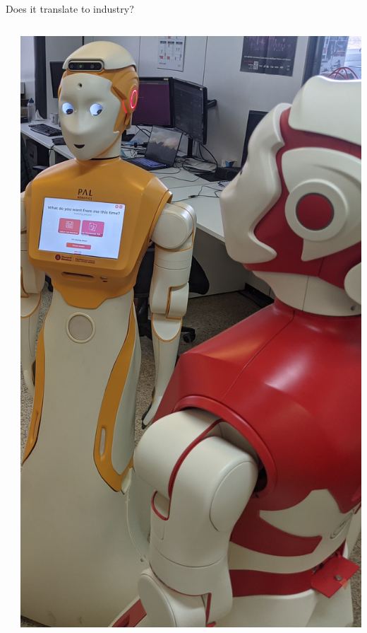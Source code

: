 \documentclass[xcolor=table,aspectratio=169]{beamer}
\begin{document}
\begin{frame}{Does it translate to industry?}
\begin{columns}
\begin{column}{0.7\linewidth}
\begin{itemize}
            \end{itemize}
        \end{column}
        \begin{column}{0.3\linewidth}
            \begin{center}
                \includegraphics[height=0.7\pageheight]{figs/aris.jpg}
            \end{center}
        \end{column}
    \end{columns}


\end{frame}
\end{document}
